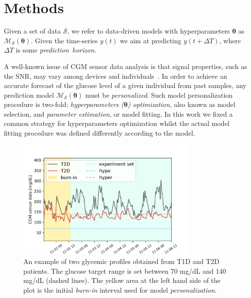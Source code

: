 \section{Methods}


Given a set of data $\mathcal{S}$, we refer to data-driven models with hyperparameters $\bm{\theta}$ as $\mathcal{M}_\mathcal{S}(\bm{\theta})$.
Given the time-series $y(t)$ we aim at predicting $y(t+\Delta T)$, where $\Delta T$ is some {\em prediction~horizon}.

A well-known issue of CGM sensor data analysis is that signal properties, such as the SNR, may vary among devices and individuals~\cite{facchinetti2010online}. In order to achieve an accurate forecast of the glucose level of a given individual from past samples, any prediction model $\mathcal{M}_\mathcal{S}(\bm{\theta})$ must be {\em personalized}. Such model personalization procedure is two-fold: {\em hyperparameters ($\bm{\theta}$) optimization}, also known as model selection, and {\em parameter estimation}, or model fitting. 
In this work we fixed a common strategy for hyperparameters optimization whilst the actual model fitting procedure was defined differently according to the model. 

\begin{figure}[h!]
	\caption{An example of two glycemic profiles obtained from T1D and T2D patients. The glucose target range is set between 70 mg/dL and 140 mg/dL (dashed lines). The yellow area at the left hand side of the plot is the initial {\em burn-in} interval used for model {\em personalization}.}\label{fig:cgm}
	\centering
	\includegraphics[width=0.8\textwidth]{images/part2/cgm_values.png}
\end{figure}

